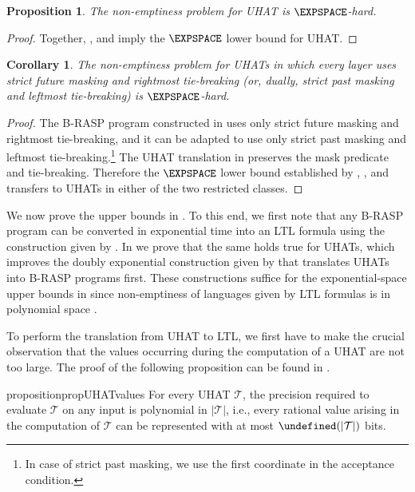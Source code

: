 \documentclass{article} %
\newtheorem{proposition}[theorem]{Proposition}
\newtheorem{corollary}[theorem]{Corollary}
\let\poly\undefined
\DeclareMathOperator{\poly}{poly}
\newcommand{\trans}{\mathcal{T}}
\begin{document}
\begin{proposition}\label{prop:UHAT-hardness}
The non-emptiness problem for UHAT is $\EXPSPACE$-hard.
\end{proposition}
\begin{proof}
Together, ,  and  imply the $\EXPSPACE$ lower bound for UHAT.
\end{proof}

\begin{corollary}
The non-emptiness problem for UHATs in which every layer uses strict future masking and rightmost tie-breaking (or, dually, strict past masking and leftmost tie-breaking) is $\EXPSPACE$-hard.
\end{corollary}
\begin{proof}
The B-RASP program constructed in  uses only strict future masking and rightmost tie-breaking, and it can be adapted to use only strict past masking and leftmost tie-breaking.\footnote{In case of strict past masking, we use the first coordinate in the acceptance condition.} The UHAT translation in  preserves the mask predicate and tie-breaking. Therefore the $\EXPSPACE$ lower bound established by , , and  transfers to UHATs in either of the two restricted classes.
\end{proof}

We now prove the upper bounds in .
To this end, we first note that any B-RASP program can be converted in exponential time into an LTL formula
using the construction given by \citet{YangCA24}.
In  we prove that the same holds true for UHATs,
which improves the doubly exponential construction given by \citet{YangCA24} that translates UHATs into B-RASP programs first.
These constructions suffice for the exponential-space upper bounds in  since
non-emptiness of languages given by LTL formulas is in polynomial space \citep{SistlaC85}.

To perform the translation from UHAT to LTL, we first have to make the crucial observation that the values occurring during the computation of a UHAT are not too large.
The proof of the following proposition can be found in .
\begin{restatable}[]{proposition}{propUHATvalues}\label{lem:UHAT-values}
For every UHAT $\trans$, the precision required to evaluate $\trans$ on any input is polynomial in $|\trans|$, i.e., every rational value arising in the computation of $\trans$ can be represented with at most $\poly(|\trans|)$ bits.
\end{restatable}
\end{document}
